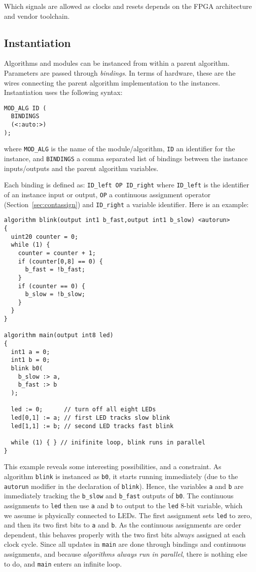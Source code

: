 \documentclass[a4]{article}
\begin{document}
Which signals are allowed as clocks and resets depends on the FPGA architecture
and vendor toolchain.


\subsection{Instantiation}
\label{sec:instantiation}

Algorithms and modules can be instanced from within a parent algorithm. Parameters
are passed through \textit{bindings}. In terms of hardware, these are the wires
connecting the parent algorithm implementation to the instances.
%
Instantiation uses the following syntax:
%
\begin{verbatim}
MOD_ALG ID (
  BINDINGS
  (<:auto:>)
);
\end{verbatim}
%
where \texttt{MOD\_ALG} is the name of the module/algorithm, \texttt{ID} an
identifier for the instance, and \texttt{BINDINGS} a comma separated list of 
bindings between the instance inputs/outputs and the parent algorithm variables.

Each binding is defined as:
\texttt{ID\_left OP ID\_right} 
where \texttt{ID\_left}
is the identifier of an instance input or output, \texttt{OP} a continuous
assignment operator (Section~\ref{sec:contassign}) and \texttt{ID\_right} a variable
identifier.
%
Here is an example:
%
\begin{verbatim}
algorithm blink(output int1 b_fast,output int1 b_slow) <autorun>
{
  uint20 counter = 0;
  while (1) {
    counter = counter + 1;
    if (counter[0,8] == 0) {
      b_fast = !b_fast;
    }
    if (counter == 0) {
      b_slow = !b_slow;
    }
  }
}

algorithm main(output int8 led)
{
  int1 a = 0;
  int1 b = 0;
  blink b0(
    b_slow :> a,
    b_fast :> b
  );
  
  led := 0;      // turn off all eight LEDs
  led[0,1] := a; // first LED tracks slow blink
  led[1,1] := b; // second LED tracks fast blink
  
  while (1) { } // inifinite loop, blink runs in parallel
}
\end{verbatim}
%
This example reveals some interesting possibilities, and a constraint.
As algorithm \texttt{blink} is instanced as \texttt{b0}, it starts running immediately (due to the \texttt{autorun} modifier in the declaration of \texttt{blink}). Hence, the variables \texttt{a} and \texttt{b}
are immediately tracking the \texttt{b\_slow} and \texttt{b\_fast} outputs of \texttt{b0}. The continuous assignments to \texttt{led} then use \texttt{a} and \texttt{b} to output to the \texttt{led} 8-bit variable, which we assume is physically connected to LEDs. The first assignment sets \texttt{led} to zero, and then its two first bits to \texttt{a} and \texttt{b}. As the continuous assignments are order dependent, this behaves properly with the two first bits always assigned at each clock cycle. Since all updates in \texttt{main} are done through bindings and continuous assignments, and because \textit{algorithms always run in parallel}, there is nothing else to do, and \texttt{main} enters an infinite loop.
\end{document}
